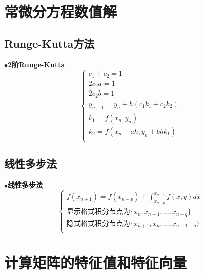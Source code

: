 \documentclass[UTF8]{article}
\newcommand{\keypoint}[2]{$\bullet$\textbf{#1}\quad#2\par}
\begin{document}
\section{常微分方程数值解}
\subsection{Runge-Kutta方法}
\keypoint{2阶Runge-Kutta}{
	$$
	\left\{
	\begin{array}{l}
	c_1+c_2=1\\
	2c_2a=1\\
	2c_2b=1\\
	y_{n+1}=y_n+h(c_1k_1+c_2k_2)\\
	k_1=f(x_n,y_n)\\
	k_2=f(x_n+ah,y_n+bhk_1)\\
	\end{array}
	\right.
	$$
}
\subsection{线性多步法}
\keypoint{线性多步法}{
	$$
	\left\{
	\begin{array}{l}
	f(x_{n+1})=f(x_{n-p})+\int\nolimits_{x_{n-p}}^{x_{n+1}}f(x,y)dx\\
	\mbox{显示格式积分节点为}\{x_n,x_{n-1},\dots,x_{n-q}\}\\
	\mbox{隐式格式积分节点为}\{x_{n+1},x_{n},\dots,x_{n+1-q}\}\\
	\end{array}
	\right.
	$$
}



\section{计算矩阵的特征值和特征向量}
\end{document}
